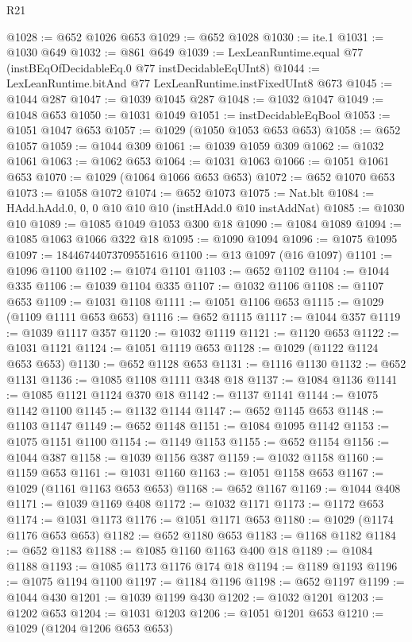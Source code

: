 \begin{lexlean}{R21}
\begin{coremodule}
{{{{{{{{{{{{{{{@1028 := @652 @1026 @653
@1029 := @652 @1028
@1030 := ite.{1}
@1031 := @1030 @649
@1032 := @861 @649
@1039 := LexLeanRuntime.equal @77 (instBEqOfDecidableEq.{0} @77 instDecidableEqUInt8)
@1044 := LexLeanRuntime.bitAnd @77 LexLeanRuntime.instFixedUInt8 @673
@1045 := @1044 @287
@1047 := @1039 @1045 @287
@1048 := @1032 @1047
@1049 := @1048 @653
@1050 := @1031 @1049
@1051 := instDecidableEqBool
@1053 := @1051 @1047 @653
@1057 := @1029 (@1050 @1053 @653 @653)
@1058 := @652 @1057
@1059 := @1044 @309
@1061 := @1039 @1059 @309
@1062 := @1032 @1061
@1063 := @1062 @653
@1064 := @1031 @1063
@1066 := @1051 @1061 @653
@1070 := @1029 (@1064 @1066 @653 @653)
@1072 := @652 @1070 @653
@1073 := @1058 @1072
@1074 := @652 @1073
@1075 := Nat.blt
@1084 := HAdd.hAdd.{0, 0, 0} @10 @10 @10 (instHAdd.{0} @10 instAddNat)
@1085 := @1030 @10
@1089 := @1085 @1049 @1053 @300 @18
@1090 := @1084 @1089
@1094 := @1085 @1063 @1066 @322 @18
@1095 := @1090 @1094
@1096 := @1075 @1095
@1097 := 18446744073709551616
@1100 := @13 @1097 (@16 @1097)
@1101 := @1096 @1100
@1102 := @1074 @1101
@1103 := @652 @1102
@1104 := @1044 @335
@1106 := @1039 @1104 @335
@1107 := @1032 @1106
@1108 := @1107 @653
@1109 := @1031 @1108
@1111 := @1051 @1106 @653
@1115 := @1029 (@1109 @1111 @653 @653)
@1116 := @652 @1115
@1117 := @1044 @357
@1119 := @1039 @1117 @357
@1120 := @1032 @1119
@1121 := @1120 @653
@1122 := @1031 @1121
@1124 := @1051 @1119 @653
@1128 := @1029 (@1122 @1124 @653 @653)
@1130 := @652 @1128 @653
@1131 := @1116 @1130
@1132 := @652 @1131
@1136 := @1085 @1108 @1111 @348 @18
@1137 := @1084 @1136
@1141 := @1085 @1121 @1124 @370 @18
@1142 := @1137 @1141
@1144 := @1075 @1142 @1100
@1145 := @1132 @1144
@1147 := @652 @1145 @653
@1148 := @1103 @1147
@1149 := @652 @1148
@1151 := @1084 @1095 @1142
@1153 := @1075 @1151 @1100
@1154 := @1149 @1153
@1155 := @652 @1154
@1156 := @1044 @387
@1158 := @1039 @1156 @387
@1159 := @1032 @1158
@1160 := @1159 @653
@1161 := @1031 @1160
@1163 := @1051 @1158 @653
@1167 := @1029 (@1161 @1163 @653 @653)
@1168 := @652 @1167
@1169 := @1044 @408
@1171 := @1039 @1169 @408
@1172 := @1032 @1171
@1173 := @1172 @653
@1174 := @1031 @1173
@1176 := @1051 @1171 @653
@1180 := @1029 (@1174 @1176 @653 @653)
@1182 := @652 @1180 @653
@1183 := @1168 @1182
@1184 := @652 @1183
@1188 := @1085 @1160 @1163 @400 @18
@1189 := @1084 @1188
@1193 := @1085 @1173 @1176 @174 @18
@1194 := @1189 @1193
@1196 := @1075 @1194 @1100
@1197 := @1184 @1196
@1198 := @652 @1197
@1199 := @1044 @430
@1201 := @1039 @1199 @430
@1202 := @1032 @1201
@1203 := @1202 @653
@1204 := @1031 @1203
@1206 := @1051 @1201 @653
@1210 := @1029 (@1204 @1206 @653 @653)
}}}}}}}}}}}}}}}
\end{coremodule}
\end{lexlean}
